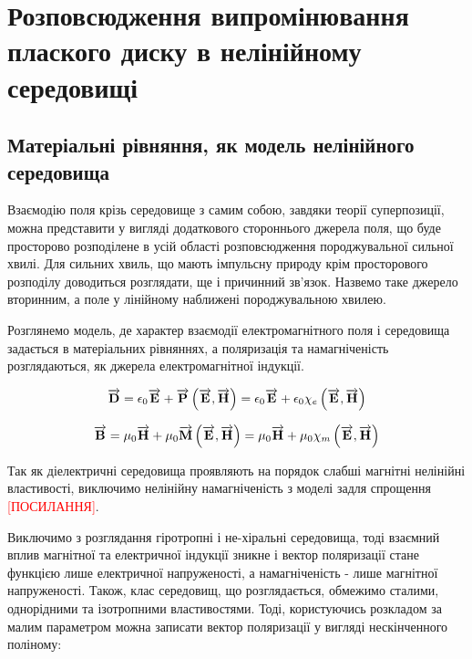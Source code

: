 \chapter{Розповсюдження випромінювання плаского диску в нелінійному середовищі}
\label{ch:nonlinear}

\section{Матеріальні рівняння, як модель нелінійного середовища}

Взаємодію поля крізь середовище з самим собою, завдяки теорії суперпозиції, 
можна представити у вигляді додаткового стороннього джерела поля, що буде 
просторово розподілене в усій області розповсюдження породжувальної 
сильної хвилі. Для сильних хвиль, що мають імпульсну природу 
крім просторового розподілу доводиться розглядати, ще і причинний 
зв'язок. Назвемо таке джерело вторинним, а поле у лінійному наближені 
породжувальною хвилею.

Розглянемо модель, де характер взаємодії електромагнітного поля і середовища 
задається в матеріальних рівняннях, а поляризація та намагніченість 
розглядаються, як джерела електромагнітної індукції.

\begin{equation*}
\overrightarrow{\mathbf D} = \epsilon_0 \overrightarrow{\mathbf E} + \overrightarrow{\mathbf P} \left( \overrightarrow{\mathbf E}, \overrightarrow{\mathbf H} \right) =
\epsilon_0 \overrightarrow{\mathbf E} + \epsilon_0 \chi_e \left( \overrightarrow{\mathbf E}, \overrightarrow{\mathbf H} \right)
\end{equation*}

\begin{equation*}
\overrightarrow{\mathbf B} = \mu_0 \overrightarrow{\mathbf H} + \mu_0 \overrightarrow{\mathbf M} \left( \overrightarrow{\mathbf E}, \overrightarrow{\mathbf H} \right) =
\mu_0 \overrightarrow{\mathbf H} + \mu_0 \chi_m \left( \overrightarrow{\mathbf E}, \overrightarrow{\mathbf H} \right)
\end{equation*}

Так як діелектричні середовища проявляють на порядок слабші магнітні
нелінійні властивості, виключимо нелінійну намагніченість з моделі задля
спрощення \textcolor{red}{[ПОСИЛАННЯ]}.

Виключимо з розглядання гіротропні і не-хіральні середовища, тоді взаємний 
вплив магнітної та електричної індукції зникне і вектор поляризації стане 
функцією лише електричної напруженості, а намагніченість - лише магнітної
напруженості. Також, клас середовищ, що розглядається, обмежимо сталими, 
однорідними та ізотропними властивостями. Тоді, користуючись розкладом за 
малим параметром можна записати вектор поляризації у вигляді нескінченного 
поліному:

